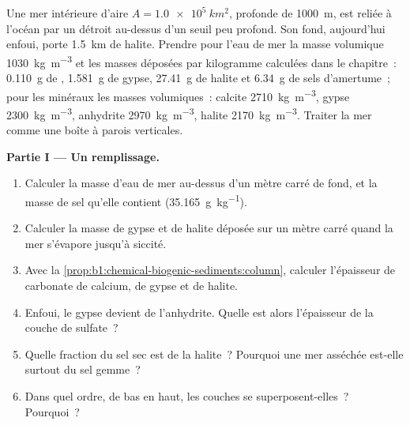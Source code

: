 \begin{problem}
\label{pb:b1:chemical-biogenic-sediments:1}
Une mer intérieure d'aire $A = \qty{1.0e5}{km^2}$, profonde de \qty{1000}{m}, est reliée à
l'océan par un détroit au-dessus d'un seuil peu profond. Son fond, aujourd'hui enfoui, porte
\qty{1.5}{km} de halite. Prendre pour l'eau de mer la masse volumique \qty{1030}{kg.m^{-3}} et
les masses déposées par kilogramme calculées dans le chapitre~: \qty{0.110}{g} de
, \qty{1.581}{g} de gypse, \qty{27.41}{g} de halite et
\qty{6.34}{g} de sels d'amertume~; pour les minéraux les masses volumiques~: calcite
\qty{2710}{kg.m^{-3}}, gypse \qty{2300}{kg.m^{-3}}, anhydrite
\qty{2970}{kg.m^{-3}}, halite \qty{2170}{kg.m^{-3}}. Traiter la mer comme une boîte à
parois verticales.

\medskip
\noindent\textbf{Partie I --- Un remplissage.}
\begin{enumerate}
  \item Calculer la masse d'eau de mer au-dessus d'un mètre carré de fond, et
        la masse de sel qu'elle contient (\qty{35.165}{g.kg^{-1}}).
  \item Calculer la masse de gypse et de halite déposée sur un mètre carré
        quand la mer s'évapore jusqu'à siccité.
  \item Avec la \cref{prop:b1:chemical-biogenic-sediments:column}, calculer
        l'épaisseur de carbonate de calcium, de gypse et de halite.
  \item Enfoui, le gypse devient de l'anhydrite. Quelle est alors l'épaisseur de la
        couche de sulfate~?
  \item Quelle fraction du sel sec est de la halite~? Pourquoi une mer asséchée est-elle surtout
        du sel gemme~?
  \item Dans quel ordre, de bas en haut, les couches se superposent-elles~? Pourquoi~?
\end{enumerate}


\end{problem}
